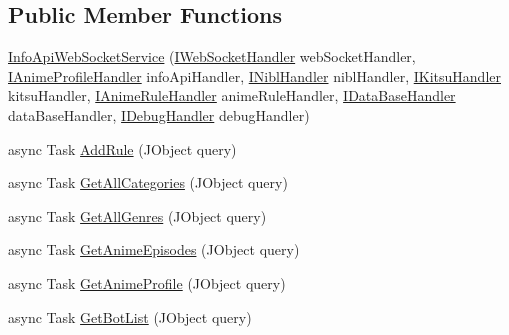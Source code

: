 \subsection*{Public Member Functions}
\begin{DoxyCompactItemize}
\item 
\mbox{\hyperlink{class_little_weeb_library_1_1_services_1_1_info_api_web_socket_service_accba84b6333a0472f3acae2469ce5da3}{Info\+Api\+Web\+Socket\+Service}} (\mbox{\hyperlink{interface_little_weeb_library_1_1_handlers_1_1_i_web_socket_handler}{I\+Web\+Socket\+Handler}} web\+Socket\+Handler, \mbox{\hyperlink{interface_little_weeb_library_1_1_handlers_1_1_i_anime_profile_handler}{I\+Anime\+Profile\+Handler}} info\+Api\+Handler, \mbox{\hyperlink{interface_little_weeb_library_1_1_handlers_1_1_i_nibl_handler}{I\+Nibl\+Handler}} nibl\+Handler, \mbox{\hyperlink{interface_little_weeb_library_1_1_handlers_1_1_i_kitsu_handler}{I\+Kitsu\+Handler}} kitsu\+Handler, \mbox{\hyperlink{interface_little_weeb_library_1_1_handlers_1_1_i_anime_rule_handler}{I\+Anime\+Rule\+Handler}} anime\+Rule\+Handler, \mbox{\hyperlink{interface_little_weeb_library_1_1_handlers_1_1_i_data_base_handler}{I\+Data\+Base\+Handler}} data\+Base\+Handler, \mbox{\hyperlink{interface_little_weeb_library_1_1_handlers_1_1_i_debug_handler}{I\+Debug\+Handler}} debug\+Handler)
\item 
async Task \mbox{\hyperlink{class_little_weeb_library_1_1_services_1_1_info_api_web_socket_service_a0ed7b2a1d1fe30b43d06232719570435}{Add\+Rule}} (J\+Object query)
\item 
async Task \mbox{\hyperlink{class_little_weeb_library_1_1_services_1_1_info_api_web_socket_service_a310f91aba5d17d8202aea81442da2545}{Get\+All\+Categories}} (J\+Object query)
\item 
async Task \mbox{\hyperlink{class_little_weeb_library_1_1_services_1_1_info_api_web_socket_service_a2882975741be27c69b461509d48e2636}{Get\+All\+Genres}} (J\+Object query)
\item 
async Task \mbox{\hyperlink{class_little_weeb_library_1_1_services_1_1_info_api_web_socket_service_a754f738fba586cc927d64251329c736a}{Get\+Anime\+Episodes}} (J\+Object query)
\item 
async Task \mbox{\hyperlink{class_little_weeb_library_1_1_services_1_1_info_api_web_socket_service_a12f4d83332b28988ce0e2bc5ff3ed369}{Get\+Anime\+Profile}} (J\+Object query)
\item 
async Task \mbox{\hyperlink{class_little_weeb_library_1_1_services_1_1_info_api_web_socket_service_a5f91364bc403db5d521f15881a385143}{Get\+Bot\+List}} (J\+Object query)

\end{DoxyCompactItemize}
